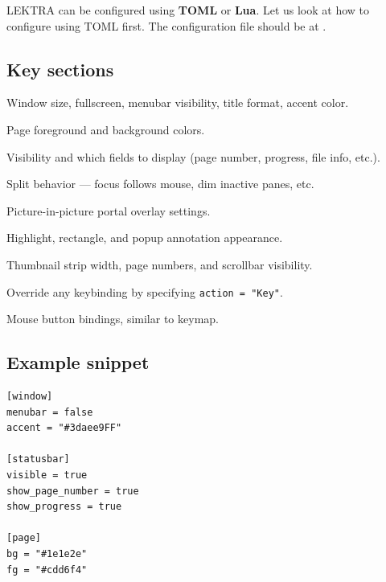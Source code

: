 \documentclass[a4paper,12pt]{article}
\begin{document}
LEKTRA can be configured using \textbf{TOML} or \textbf{Lua}. Let us look at how to configure using TOML first. The configuration file should be at .

\subsection{Key sections}

\begin{description}[leftmargin=0pt]
    \item[\texttt{[window]}] Window size, fullscreen, menubar visibility, title format, accent color.
    \item[\texttt{[page]}] Page foreground and background colors.
    \item[\texttt{[statusbar]}] Visibility and which fields to display (page number, progress, file info, etc.).
    \item[\texttt{[split]}] Split behavior — focus follows mouse, dim inactive panes, etc.
    \item[\texttt{[portal]}] Picture-in-picture portal overlay settings.
    \item[\texttt{[annotations.*]}] Highlight, rectangle, and popup annotation appearance.
    \item[\texttt{[thumbnail\_panel]}] Thumbnail strip width, page numbers, and scrollbar visibility.
    \item[\texttt{[keymap]}] Override any keybinding by specifying \texttt{action = "Key"}.
    \item[\texttt{[mousemap]}] Mouse button bindings, similar to keymap.
\end{description}

\subsection{Example snippet}

\begin{tcolorbox}[colback=gray!5, colframe=gray!40, boxrule=0.4pt, arc=4pt,
    fontupper=\ttfamily\small]
\begin{verbatim}
[window]
menubar = false
accent = "#3daee9FF"

[statusbar]
visible = true
show_page_number = true
show_progress = true

[page]
bg = "#1e1e2e"
fg = "#cdd6f4"
\end{verbatim}
\end{tcolorbox}
\end{document}

